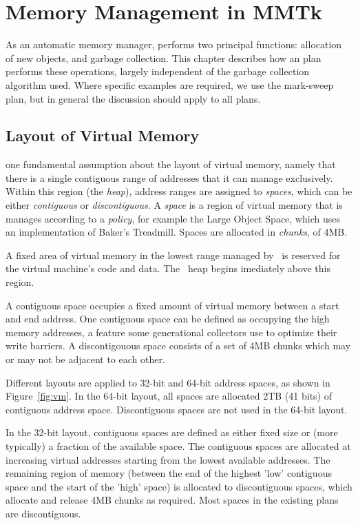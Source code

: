 \chapter{Memory Management in MMTk}

As an automatic memory manager, \mmtk performs two principal functions: 
allocation of new objects, and garbage collection.  This chapter describes
how an \mmtk plan performs these operations, largely independent of the 
garbage collection algorithm used.  Where specific examples are required,
we use the mark-sweep plan, but in general the discussion should apply to all
\mmtk plans.

\section{Layout of Virtual Memory}

\mmtk one fundamental assumption about the layout of virtual memory, namely that
there is a single contiguous range of addresses that it can manage exclusively. 
Within this region (the \emph{heap}), address ranges are assigned to
\emph{spaces}, which can be either \emph{contiguous} or \emph{discontiguous}.  A
\emph{space} is a region of virtual memory that is manages according to a
\emph{policy}, for example the Large Object Space, which uses an
implementation of Baker's Treadmill.  Spaces are allocated in \emph{chunks}, of
4MB.

A fixed area of virtual memory in the lowest range managed by \mmtk\ is reserved
for the virtual machine's code and data.  The \mmtk\ heap begins imediately
above this region.

A contiguous space occupies a fixed amount of virtual memory between a start and
end address.  
One contiguous space can be defined as occupying the
high memory addresses, a feature some generational collectors use to optimize
their write barriers.  
A discontigouous space consists of a set of 4MB chunks which may
or may not be adjacent to each other.

Different layouts are applied to 32-bit and 64-bit address spaces, as shown in
Figure~\ref{fig:vm}.
In the 64-bit layout, all spaces are allocated 2TB (41 bits) of contiguous address
space.  Discontiguous spaces are not used in the 64-bit layout.

In the 32-bit layout, contiguous spaces are defined as either fixed size or
(more typically) a fraction of the available space.  
The contiguous spaces are allocated at
increasing virtual addresses starting from the lowest available addresses.
The remaining region of memory (between the end of the highest 'low' contiguous
space and the start of the 'high' space) is allocated to discontiguous spaces,
which allocate and release 4MB chunks as required.  Most spaces in the existing \mmtk plans are discontiguous.

